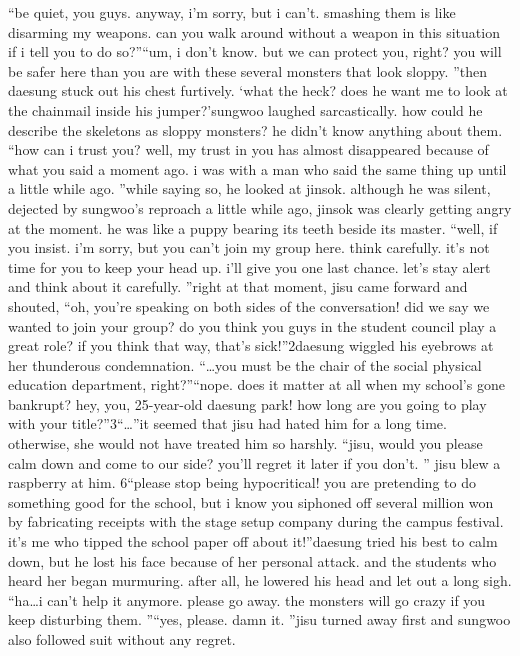 “be quiet, you guys.
 anyway, i’m sorry, but i can’t.
 smashing them is like disarming my weapons.
 can you walk around without a weapon in this situation if i tell you to do so?”“um, i don’t know.
 but we can protect you, right? you will be safer here than you are with these several monsters that look sloppy.
”then daesung stuck out his chest furtively.
‘what the heck? does he want me to look at the chainmail inside his jumper?’sungwoo laughed sarcastically.
 how could he describe the skeletons as sloppy monsters? he didn’t know anything about them.
“how can i trust you? well, my trust in you has almost disappeared because of what you said a moment ago.
 i was with a man who said the same thing up until a little while ago.
”while saying so, he looked at jinsok.
 although he was silent, dejected by sungwoo’s reproach a little while ago, jinsok was clearly getting angry at the moment.
 he was like a puppy bearing its teeth beside its master.
“well, if you insist.
 i’m sorry, but you can’t join my group here.
 think carefully.
 it’s not time for you to keep your head up.
 i’ll give you one last chance.
 let’s stay alert and think about it carefully.
”right at that moment, jisu came forward and shouted, “oh, you’re speaking on both sides of the conversation! did we say we wanted to join your group? do you think you guys in the student council play a great role? if you think that way, that’s sick!”2daesung wiggled his eyebrows at her thunderous condemnation.
“…you must be the chair of the social physical education department, right?”“nope.
 does it matter at all when my school’s gone bankrupt? hey, you, 25-year-old daesung park! how long are you going to play with your title?”3“…”it seemed that jisu had hated him for a long time.
 otherwise, she would not have treated him so harshly.
“jisu, would you please calm down and come to our side? you’ll regret it later if you don’t.
”
jisu blew a raspberry at him.
6“please stop being hypocritical! you are pretending to do something good for the school, but i know you siphoned off several million won by fabricating receipts with the stage setup company during the campus festival.
 it’s me who tipped the school paper off about it!”daesung tried his best to calm down, but he lost his face because of her personal attack.
 and the students who heard her began murmuring.
after all, he lowered his head and let out a long sigh.
“ha…i can’t help it anymore.
 please go away.
 the monsters will go crazy if you keep disturbing them.
”“yes, please.
 damn it.
”jisu turned away first and sungwoo also followed suit without any regret.
